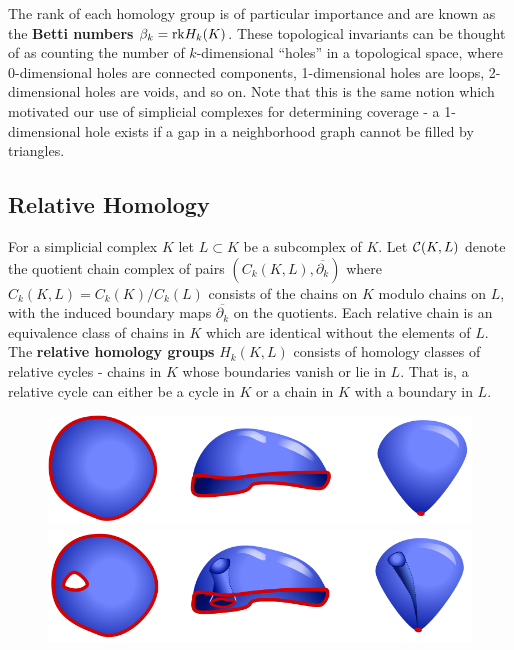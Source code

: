 The rank of each homology group is of particular importance and are known as the \textbf{Betti numbers} $\beta_k = \mathrm{rk} H_k(K)$.
These topological invariants can be thought of as counting the number of $k$-dimensional ``holes'' in a topological space, where 0-dimensional holes are connected components, 1-dimensional holes are loops, 2-dimensional holes are voids, and so on.
Note that this is the same notion which motivated our use of simplicial complexes for determining coverage - a 1-dimensional hole exists if a gap in a neighborhood graph cannot be filled by triangles.

\subsection{Relative Homology}

For a simplicial complex $K$ let $L\subset K$ be a subcomplex of $K$.
Let $\mathcal{C}(K, L)$ denote the quotient chain complex of pairs $(C_k(K, L), \overline{\partial_k})$ where $C_k(K, L) = C_k(K)/C_k(L)$ consists of the chains on $K$ modulo chains on $L$, with the induced boundary maps $\overline{\partial_k}$ on the quotients.
Each relative chain is an equivalence class of chains in $K$ which are identical without the elements of $L$.
The \textbf{relative homology groups} $H_k(K, L)$ consists of homology classes of relative cycles - chains in $K$ whose boundaries vanish or lie in $L$.
That is, a relative cycle can either be a cycle in $K$ or a chain in $K$ with a boundary in $L$.

\begin{figure}[htbp]
\centering
    \includegraphics[scale=0.5]{figures/balloons1.png}\vspace{2ex}
    \includegraphics[scale=0.5]{figures/balloons3.png}
    \caption{}
    \label{fig:balloons1}
\end{figure}

